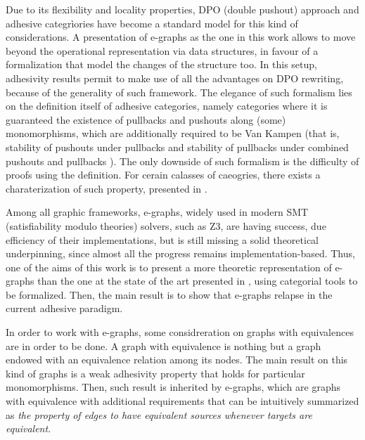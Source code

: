 Due to its flexibility and locality properties, DPO (double pushout) approach and adhesive categrìories have become a standard model for this kind of considerations. 
A presentation of e-graphs as the one in this work allows to move beyond the operational representation via data structures, in favour of a formalization that model the changes of the structure too.
In this setup, adhesivity results permit to make use of all the advantages on DPO rewriting, because of the generality of such framework.
The elegance of such formalism lies on the definition itself of adhesive categories, namely categories where it is guaranteed the existence of pullbacks and pushouts along (some) monomorphisms, which are additionally required to be Van Kampen (that is, stability of pushouts under pullbacks and stability of pullbacks under combined pushouts and pullbacks \cite{Ehrig_Golas}).
The only downside of such formalism is the difficulty of proofs using the definition. For cerain calasses of caeogries, there exists a charaterization of such property, presented in \cite{castelnovo2022newcriterionmathcalmmathcalnadhesivity}.

Among all graphic frameworks, e-graphs, widely used in modern SMT (satisfiability modulo theories) solvers, such as Z3, are having success, due efficiency of their implementations, but is still missing a solid theoretical underpinning, since almost all the progress remains implementation-based.
Thus, one of the aims of this work is to present a more theoretic representation of e-graphs than the one at the state of the art presented in \cite{egg}, using categorial tools to be formalized.
Then, the main result is to show that e-graphs relapse in the current adhesive paradigm.

In order to work with e-graphs, some considreration on graphs with equivalences are in order to be done. A graph with equivalence is nothing but a graph endowed with an equivalence relation among its nodes. The main result on this kind of graphs is a weak adhesivity property that holds for particular monomorphisms. Then, such result is inherited by e-graphs, which are graphs with equivalence with additional requirements that can be intuitively summarized as \textit{the property of edges to have equivalent sources whenever targets are equivalent}.


